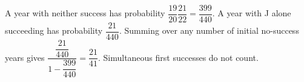 A year with neither success has probability $\dfrac{19}{20}\dfrac{21}{22}=\dfrac{399}{440}$. A year with J alone succeeding has probability $\dfrac{21}{440}$. Summing over any number of initial no-success years gives $\dfrac{\dfrac{21}{440}}{1-\dfrac{399}{440}}=\boxed{\dfrac{21}{41}}$. Simultaneous first successes do not count.

